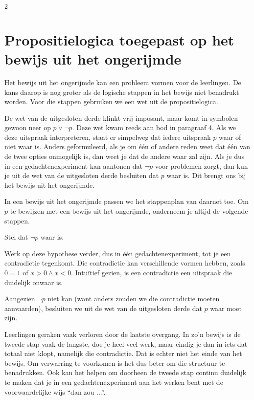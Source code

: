 \begin{multicols}{2}
\section{Propositielogica toegepast op het bewijs uit het ongerijmde}
Het bewijs uit het ongerijmde kan een probleem vormen voor de leerlingen.
De kans daarop is nog groter als de logische stappen in het bewijs niet benadrukt worden.
Voor die stappen gebruiken we een wet uit de propositielogica.

De wet van de uitgesloten derde klinkt vrij imposant, maar komt in symbolen gewoon neer op $p \lor \lnot p$.
Deze wet kwam reeds aan bod in paragraaf 4.
Als we deze uitspraak interpreteren, staat er simpelweg dat iedere uitspraak $p$ waar of niet waar is.
Anders geformuleerd, als je om één of andere reden weet dat één van de twee opties onmogelijk is, dan weet je dat de andere waar zal zijn.
Als je dus in een gedachtenexperiment kan aantonen dat $\lnot p$ voor problemen zorgt, dan kun je uit de wet van de uitgesloten derde besluiten dat $p$ waar is.
Dit brengt ons bij het bewijs uit het ongerijmde.

In een bewijs uit het ongerijmde passen we het stappenplan van daarnet toe.
Om $p$ te bewijzen met een bewijs uit het ongerijmde, onderneem je altijd de volgende stappen.
\begin{opsomming}
    \item Stel dat $\lnot p$ waar is.
    \item Werk op deze hypothese verder, dus in één gedachtenexperiment, tot je een contradictie tegenkomt.
    Die contradictie kan verschillende vormen hebben, zoals $0=1$ of $x>0 \land x<0$.
    Intuïtief gezien, is een contradictie een uitspraak die duidelijk onwaar is.
    \item Aangezien $\lnot p$ niet kan (want anders zouden we die contradictie moeten aanvaarden), besluiten we uit de wet van de uitgesloten derde dat $p$ waar moet zijn.
\end{opsomming}
Leerlingen geraken vaak verloren door de laatste overgang.
In zo'n bewijs is de tweede stap vaak de langste, doe je heel veel werk, maar eindig je dan in iets dat totaal niet klopt, namelijk die contradictie.
Dat is echter niet het einde van het bewijs.
Om verwarring te voorkomen is het dus beter om die structuur te benadrukken.
Ook kan het helpen om doorheen de tweede stap continu duidelijk te maken dat je in een gedachtenexperiment aan het werken bent met de voorwaardelijke wijs ``dan zou ...''.\\


\end{multicols}
